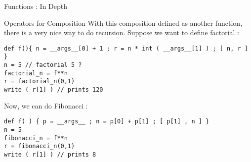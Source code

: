 \begin{section}{Functions : In Depth}
\begin{subsection}{Operators for Composition}
With this composition defined as another function, 
there is a very nice way to do recursion.
Suppose we want to define factorial :

\begin{lstlisting}[style=JexlStyle]
def f(){ n = __args__[0] + 1 ; r = n * int ( __args__[1] ) ; [ n, r ] }
n = 5 // factorial 5 ?
factorial_n = f**n 
r = factorial_n(0,1)
write ( r[1] ) // prints 120
\end{lstlisting}

Now, we can do Fibonacci :
\begin{lstlisting}[style=JexlStyle]
def f( ) { p = __args__ ; n = p[0] + p[1] ; [ p[1] , n ] }
n = 5 
fibonacci_n = f**n 
r = fibonacci_n(0,1)
write ( r[1] ) // prints 8 
\end{lstlisting}


\end{subsection}

\end{section}

